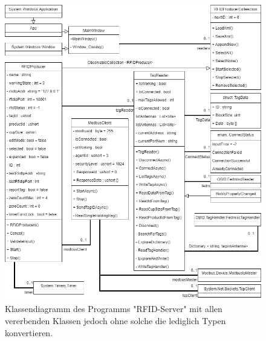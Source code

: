 \begin{figure}[h]
        \label{fig:figure8}
        \includegraphics[width = \textwidth ]{Bilder/RFID_Klassendiagramm}
        \caption[Klassendiagramm des Programms "RFID-Server" ]%
        {\small Klassendiagramm des Programms "RFID-Server" mit allen vererbenden Klassen jedoch ohne solche die
        lediglich Typen konvertieren.}
        \centering
    \end{figure}


